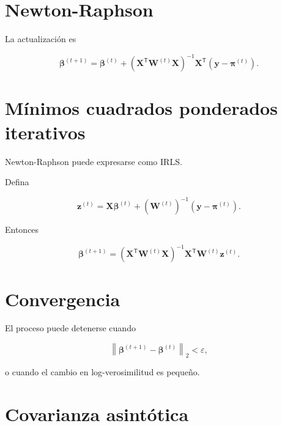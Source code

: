 \documentclass[
  spanish,
  10.5pt,
  letterpaper,
  DIV=11,
  numbers=noendperiod,
  oneside,
  open=any]{scrreprt}
\theoremstyle{definition}
\theoremstyle{definition}
\theoremstyle{plain}
\theoremstyle{remark}
\begin{document}
\section*{Newton-Raphson}\label{newton-raphson}


La actualización es

\[
\boldsymbol{\beta}^{(t+1)}
=
\boldsymbol{\beta}^{(t)}
+
\left(
\mathbf{X}^{\mathsf T}
\mathbf{W}^{(t)}
\mathbf{X}
\right)^{-1}
\mathbf{X}^{\mathsf T}
\left(
\mathbf{y}
-
\boldsymbol{\pi}^{(t)}
\right).
\]

\section*{Mínimos cuadrados ponderados
iterativos}\label{muxednimos-cuadrados-ponderados-iterativos}


Newton-Raphson puede expresarse como IRLS.

Defina

\[
\mathbf{z}^{(t)}
=
\mathbf{X}\boldsymbol{\beta}^{(t)}
+
\left(
\mathbf{W}^{(t)}
\right)^{-1}
\left(
\mathbf{y}
-
\boldsymbol{\pi}^{(t)}
\right).
\]

Entonces

\[
\boldsymbol{\beta}^{(t+1)}
=
\left(
\mathbf{X}^{\mathsf T}
\mathbf{W}^{(t)}
\mathbf{X}
\right)^{-1}
\mathbf{X}^{\mathsf T}
\mathbf{W}^{(t)}
\mathbf{z}^{(t)}.
\]

\section*{Convergencia}\label{convergencia}


El proceso puede detenerse cuando

\[
\left\|
\boldsymbol{\beta}^{(t+1)}
-
\boldsymbol{\beta}^{(t)}
\right\|_2
<
\varepsilon,
\]

o cuando el cambio en log-verosimilitud es pequeño.

\section*{Covarianza asintótica}\label{covarianza-asintuxf3tica}
\end{document}
